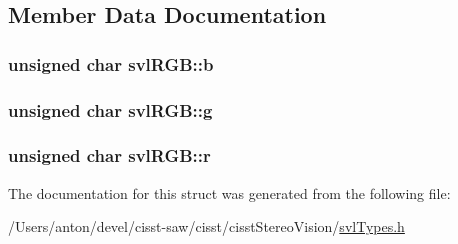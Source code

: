 \subsection{Member Data Documentation}
\hypertarget{structsvl_r_g_b_ab426f773070147f8a3bced446636662d}{}
\subsubsection[{b}]{\setlength{\rightskip}{0pt plus 5cm}unsigned char svl\+R\+G\+B\+::b}\label{structsvl_r_g_b_ab426f773070147f8a3bced446636662d}
\hypertarget{structsvl_r_g_b_aad56aeef6a029768848b46ea91b7332c}{}
\subsubsection[{g}]{\setlength{\rightskip}{0pt plus 5cm}unsigned char svl\+R\+G\+B\+::g}\label{structsvl_r_g_b_aad56aeef6a029768848b46ea91b7332c}
\hypertarget{structsvl_r_g_b_a823fa06835ecc0bbcdc9b121a13631da}{}
\subsubsection[{r}]{\setlength{\rightskip}{0pt plus 5cm}unsigned char svl\+R\+G\+B\+::r}\label{structsvl_r_g_b_a823fa06835ecc0bbcdc9b121a13631da}


The documentation for this struct was generated from the following file\+:\begin{DoxyCompactItemize}
\item 
/\+Users/anton/devel/cisst-\/saw/cisst/cisst\+Stereo\+Vision/\hyperlink{svl_types_8h}{svl\+Types.\+h}\end{DoxyCompactItemize}
